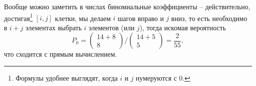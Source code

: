 Вообще можно заметить в числах биномиальные коэффициенты -- действительно, достигая\footnote{
    Формулы удобнее выглядят, когда $i$ и $j$ нумеруются с $0$. 
}  $[i, j]$ клетки, мы делаем $i$ шагов вправо и $j$ вниз, то есть необходимо в $i+j$ элементах выбрать $i$ элементов (или $j$), тогда искомая вероятность
\begin{equation*}
    P_0  = \begin{pmatrix}
        14 + 8 \\ 8
    \end{pmatrix}
    \bigg/ 
    \begin{pmatrix}
        14 + 5 \\ 5
    \end{pmatrix} = \frac{2}{55},
\end{equation*}
что сходится с прямым вычислением.